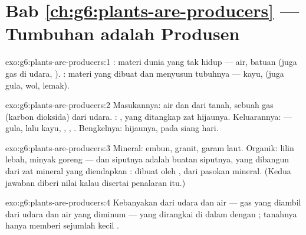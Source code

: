 \section*{Bab \ref{ch:g6:plants-are-producers} --- Tumbuhan adalah Produsen}

\begin{solution}{exo:g6:plants-are-producers:1}
: materi dunia yang tak hidup --- air, batuan (juga gas
di udara, ). : materi yang dibuat  dan menyusun tubuhnya --- kayu,  (juga gula, wol, lemak).
\end{solution}

\begin{solution}{exo:g6:plants-are-producers:2}
Masukannya: air dan  dari tanah, sebuah gas (karbon
dioksida) dari udara. : , yang ditangkap zat hijaunya.
Keluarannya:  --- gula, lalu kayu, , , .
Bengkelnya:  hijaunya, pada siang hari.
\end{solution}

\begin{solution}{exo:g6:plants-are-producers:3}
Mineral: embun, granit, garam laut. Organik: lilin lebah, minyak
goreng --- dan  siputnya adalah buatan siputnya, yang dibangun
dari zat mineral yang diendapkan : dibuat oleh ,
dari pasokan mineral. (Kedua jawaban diberi nilai kalau disertai
penalaran itu.)
\end{solution}

\begin{solution}{exo:g6:plants-are-producers:4}
Kebanyakan dari udara dan air --- gas yang diambil dari udara dan air
yang diminum  --- yang dirangkai di dalam  dengan 
; tanahnya hanya memberi sejumlah kecil .
\end{solution}

